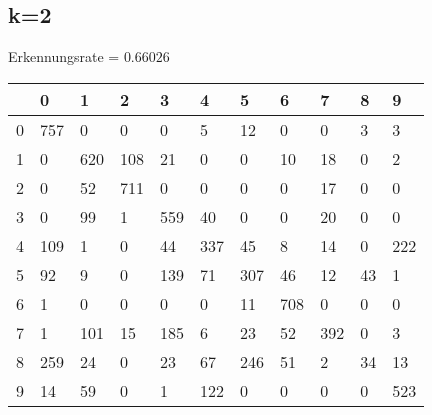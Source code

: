\documentclass[a4paper,10pt]{article}
\begin{document}
		\subsection*{k=2}
		Erkennungsrate = $0.66026$\\
		\begin{tabular}{||l|l|l|l|l|l|l|l|l|l|l|}
		 \hline 
			& 0 & 1 & 2 & 3 & 4 & 5 & 6 & 7 & 8 & 9 \\ \hline \hline
			0 & 757  &   0    & 0 &    0  &   5  &  12  &   0   &  0  &   3 &    3\\ \hline
			1 & 0 &  620&   108  &  21   &  0 &    0   & 10 &   18   &  0&     2\\ \hline
			2 & 0  &  52 &  711  &   0 &    0  &   0  &   0 &   17 &    0  &   0\\ \hline
			3 & 0  &  99   &  1 &  559 &   40 &    0  &   0  &  20  &   0 &    0\\ \hline
			4 & 109 &    1   &  0  &  44 &  337  &  45 &    8 &   14&     0 &  222\\ \hline
			5 & 92  &   9   &  0 &  139  &  71  & 307&    46  &  12  &  43 &    1\\ \hline
			6 & 1 &    0 &    0 &    0   &  0 &   11  & 708&     0 &    0  &   0\\ \hline
			7 & 1  & 101  &  15 &  185 &    6 &   23&    52 &  392 &    0 &    3\\ \hline
			8 &  259  &  24&     0  &  23  &  67  & 246&    51&     2  &  34 &   13\\ \hline
			9 & 14 &   59 &    0  &   1 &  122  &   0  &   0  &   0  &   0  & 523\\ \hline
		\end{tabular}
		
\end{document}

